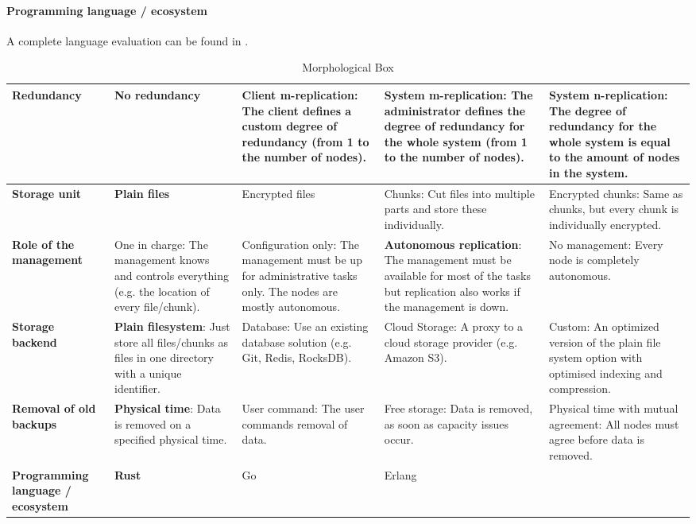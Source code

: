 \paragraph{Programming language / ecosystem}
A complete language evaluation can be found in .

\begin{table}
	\centering
	\caption[Morphological Box]{Morphological Box}
	\label{tbl:morphological-box}
    \begin{tabu}{X | X X X X}
		\hline
          \textbf{Redundancy}
          & No redundancy
          & Client m-replication: The client defines a custom degree of redundancy (from 1 to the number of nodes).
          & System m-replication: The administrator defines the degree of redundancy for the whole system (from 1 to the number of nodes).
          & \textbf{System n-replication}: The degree of redundancy for the whole system is equal to the amount of nodes in the system.
          \\ \hline

          \textbf{Storage unit}
          & \textbf{Plain files}
          & Encrypted files
          & Chunks: Cut files into multiple parts and store these individually.
          & Encrypted chunks: Same as chunks, but every chunk is individually encrypted.
          \\ \hline


          \textbf{Role of the management}
          & One in charge: The management knows and controls everything (e.g. the location of every file/chunk).
          & Configuration only: The management must be up for administrative tasks only. The nodes are mostly autonomous.
          & \textbf{Autonomous replication}: The management must be available for most of the tasks but replication also works if the management is down.
          & No management: Every node is completely autonomous.
          \\ \hline


          \textbf{Storage backend}
          & \textbf{Plain filesystem}: Just store all files/chunks as files in one directory with a unique identifier.
          & Database: Use an existing database solution (e.g. Git, Redis, RocksDB).
          & Cloud Storage: A proxy to a cloud storage provider (e.g. Amazon S3).
          & Custom: An optimized version of the plain file system option with optimised indexing and compression.
          \\ \hline


          \textbf{Removal of old backups}
          & \textbf{Physical time}: Data is removed on a specified physical time.
          & User command: The user commands removal of data.
          & Free storage: Data is removed, as soon as capacity issues occur.
          & Physical time with mutual agreement: All nodes must agree before data is removed.
          \\ \hline


          \textbf{Programming language / ecosystem}
          & \textbf{Rust}
          & Go
          & Erlang
          & 
          \\ \hline
	\end{tabu}
\end{table}

